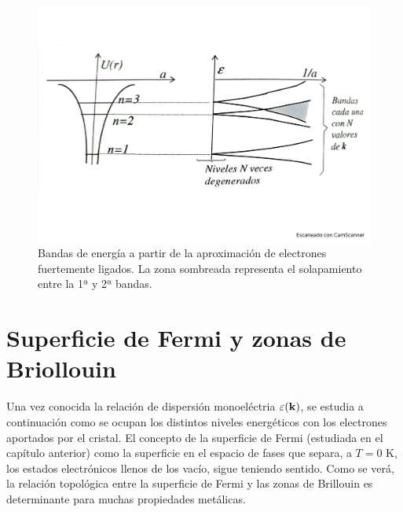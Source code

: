 \begin{figure}[h!] \centering
	\includegraphics[scale=0.35]{Cuerpo/Ch_07/Fotos libro 6.pdf}
	\caption{Bandas de energía a partir de la aproximación de electrones fuertemente ligados. La zona sombreada representa el solapamiento entre la 1ª y 2ª bandas.}
	\label{Fig:07-06}
\end{figure}    

\section{Superficie de Fermi y zonas de Briollouin}

Una vez conocida la relación de dispersión monoeléctria $\varepsilon(\mathbf{k})$, se estudia a continuación como se ocupan los distintos niveles energéticos con los electrones aportados por el cristal. El concepto de la superficie de Fermi (estudiada en el capítulo anterior) como la superficie en el espacio de fases que separa, a $T=0$ K, los estados electrónicos llenos de los vacío, sigue teniendo sentido. Como se verá, la relación topológica entre la superficie de Fermi y las zonas de Brillouin es determinante para muchas propiedades metálicas.


